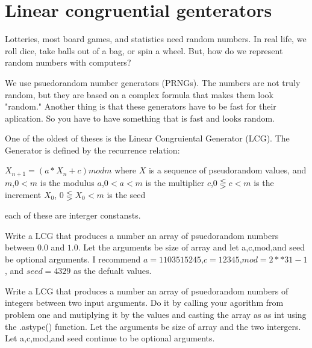 \label{Ch:PRNG}


\section*{Linear congruential genterators}


Lotteries, most board games, and statistics need random numbers. In real life, we roll dice, take balls out of a bag, or spin a wheel. But, how do we represent random numbers with computers?

We use psuedorandom number generators (PRNGs). The numbers are not truly random, but they are based on a complex formula that makes them look "random." Another thing is that these generators have to be fast for their aplication. So you have to have something that is fast and looks random.

One of the oldest of theses is the Linear Congruiental Generator (LCG). The Generator is defined by the recurrence relation:

$X_{n+1}=(a*X_n + c) mod m$
where $X$ is a sequence of pseudorandom values, and
$m$,$0<m$ is the modulus
$a$,$0<a<m$ is the multiplier
$c$,$0\lesseqgtr c<m$ is the increment
$X_0$, $0\lesseqgtr X_0 <m$ is the seed

each of these are interger constansts.



\begin{problem}
Write a LCG that produces a number an array of psuedorandom numbers between $0.0$ and $1.0$. Let the arguments be size of array and let a,c,mod,and seed be optional arguments. I recommend $a=1103515245$,$c=12345$,$mod=2**31-1$, and $seed=4329$ as the defualt values.
\end{problem}

\begin{problem}
Write a LCG that produces a number an array of psuedorandom numbers of integers between two input arguments. Do it by calling your agorithm from problem one and mutiplying it by the values and casting the array as as int using the .astype() function. Let the arguments be size of array and the two intergers. Let a,c,mod,and seed continue to be optional arguments.
\end{problem}


